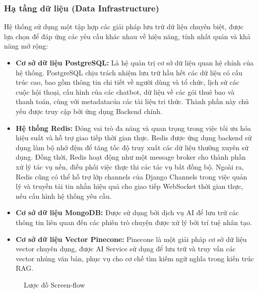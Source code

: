 \subsubsection{Hạ tầng dữ liệu (Data Infrastructure)}
Hệ thống sử dụng một tập hợp các giải pháp lưu trữ dữ liệu chuyên biệt, được lựa chọn để đáp ứng các yêu cầu khác nhau về hiệu năng, tính nhất quán và khả năng mở rộng:

\begin{itemize}
    \item \textbf{Cơ sở dữ liệu PostgreSQL:} Là hệ quản trị cơ sở dữ liệu quan hệ chính của hệ thống. PostgreSQL chịu trách nhiệm lưu trữ hầu hết các dữ liệu có cấu trúc cao, bao gồm thông tin chi tiết về người dùng và tổ chức, lịch sử các cuộc hội thoại, cấu hình của các chatbot, dữ liệu về các gói thuê bao và thanh toán, cùng với metadatacủa các tài liệu tri thức. Thành phần này chủ yếu được truy cập bởi ứng dụng Backend chính.
    
    \item \textbf{Hệ thống Redis:} Đóng vai trò đa năng và quan trọng trong việc tối ưu hóa hiệu suất và hỗ trợ giao tiếp thời gian thực. Redis được ứng dụng backend sử dụng làm bộ nhớ đệm để tăng tốc độ truy xuất các dữ liệu thường xuyên sử dụng. Đồng thời, Redis hoạt động như một message broker cho thành phần xử lý tác vụ nền, điều phối việc thực thi các tác vụ bất đồng bộ. Ngoài ra, Redis cũng có thể hỗ trợ lớp channels của Django Channels trong việc quản lý và truyền tải tin nhắn hiệu quả cho giao tiếp WebSocket thời gian thực, nếu cấu hình hệ thống yêu cầu.
    
    \item \textbf{Cơ sở dữ liệu MongoDB:} Được sử dụng bởi dịch vụ AI để lưu trữ các thông tin liên quan đến các phiên trò chuyện được xử lý bởi trí tuệ nhân tạo.
    
    \item \textbf{Cơ sở dữ liệu Vector Pinecone:} Pinecone là một giải pháp cơ sở dữ liệu vector chuyên dụng, được AI Service sử dụng để lưu trữ và truy vấn các vector nhúng văn bản, phục vụ cho cơ chế tìm kiếm ngữ nghĩa trong kiến trúc RAG.
\end{itemize}

\begin{figure}[H]
	\centering
	
	\vspace{0.5cm}
	\caption{Lược đồ Screen-flow}
	\label{fig:enter-label}
\end{figure}


